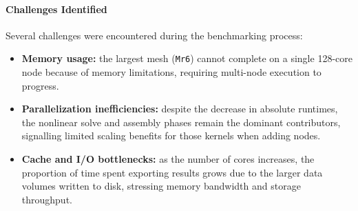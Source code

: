 \paragraph{Challenges Identified}
Several challenges were encountered during the benchmarking process:
\begin{itemize}
    \item \textbf{Memory usage:} the largest mesh (\texttt{Mr6}) cannot complete on a single 128-core node because of memory limitations, requiring multi-node execution to progress.
    \item \textbf{Parallelization inefficiencies:} despite the decrease in absolute runtimes, the nonlinear solve and assembly phases remain the dominant contributors, signalling limited scaling benefits for those kernels when adding nodes.
    \item \textbf{Cache and I/O bottlenecks:} as the number of cores increases, the proportion of time spent exporting results grows due to the larger data volumes written to disk, stressing memory bandwidth and storage throughput.
\end{itemize}

